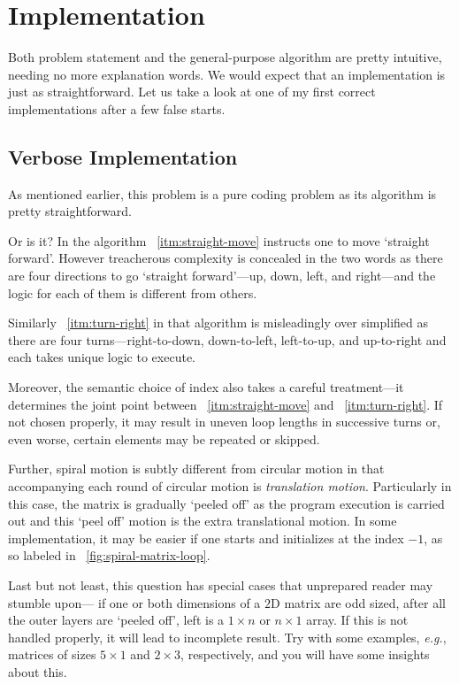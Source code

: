 \documentclass[oneside,11pt]{book}
\theoremstyle{definition}
\theoremstyle{remark}
\begin{document}
\section{Implementation}\label{sec:spiral-matrix-implementation}

Both problem statement and the general-purpose algorithm are pretty intuitive, needing no more
explanation words.
We would expect that an implementation is just as straightforward.
Let us take a look at one of my first correct implementations after a few false starts.

\subsection{Verbose Implementation}\label{subsec:verboseImplementation}

As mentioned earlier, this problem is a pure coding problem as its algorithm is pretty
straightforward.

Or is it?
In the algorithm ~\ref{itm:straight-move} instructs one to move `straight forward'.
However treacherous complexity is concealed in the two words as there are four directions
to go `straight forward'---up, down, left, and right---and the logic for each of them is different
from others.

Similarly ~\ref{itm:turn-right} in that algorithm is misleadingly over simplified as there
are four turns---right-to-down, down-to-left, left-to-up, and up-to-right and each
takes unique logic to execute.

Moreover, the semantic choice of index also takes a careful treatment---it determines
the joint point between ~\ref{itm:straight-move} and ~\ref{itm:turn-right}.
If not chosen properly, it may result in uneven loop lengths in successive turns or, even worse,
certain elements may be repeated or skipped.

Further, spiral motion is subtly different from circular motion in that accompanying each round of
circular motion is \emph{translation motion}.
Particularly in this case, the matrix is gradually `peeled off' as the program execution is
carried out and this `peel off' motion is the extra translational motion.
In some implementation, it may be easier if one starts and initializes at the index $-1$,
as so labeled in ~\autoref{fig:spiral-matrix-loop}.

Last but not least, this question has special cases that unprepared reader may
stumble upon---\label{complication-special-case}
if one or both dimensions of a $2$D matrix are odd sized, after all the outer layers are `peeled
off', left is a $1\times n$ or $n \times 1$ array.
If this is not handled properly, it will lead to incomplete result.
Try with some examples, \textit{e.g.}, matrices of sizes $5 \times 1$ and $2\times 3$,
respectively, and you will have some insights about this.
\end{document}
